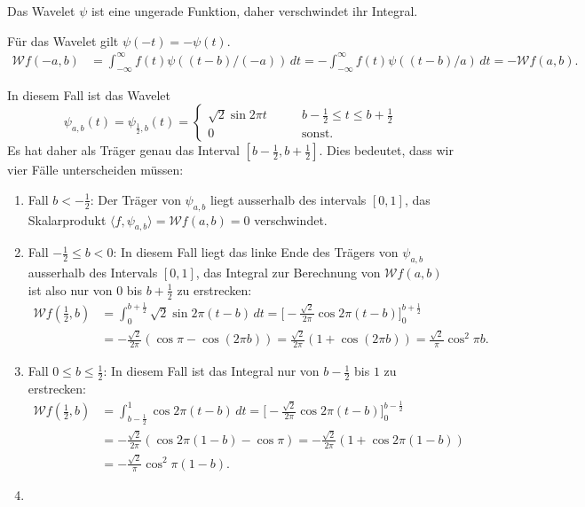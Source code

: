 \begin{loesung}
\begin{teilaufgaben}
%
\item
Das Wavelet $\psi$ ist eine ungerade Funktion, daher verschwindet ihr
Integral.
%
%
\item
Für das Wavelet gilt $\psi(-t)=-\psi(t)$.
\begin{align*}
\mathcal{W}f(-a,b)
&=
\int_{-\infty}^\infty f(t)\psi((t-b)/(-a))\,dt
=
-\int_{-\infty}^\infty f(t)\psi((t-b)/a)\,dt
=
-\mathcal{W}f(a,b).
\end{align*}
%
%
%
\item
In diesem Fall ist das Wavelet
\[
\psi_{a,b}(t)
=
\psi_{\frac12,b}(t)
=
\begin{cases}
\sqrt{2}\sin 2\pi t&\qquad b-\frac12\le t\le b+\frac12
\\
0&\qquad\text{sonst.}
\end{cases}
\]
Es hat daher als Träger genau das Interval $[b-\frac12,b+\frac12]$.
Dies bedeutet, dass wir vier Fälle unterscheiden müssen:
\begin{enumerate}
\item
Fall $b < -\frac12$:  Der Träger von $\psi_{a,b}$ liegt ausserhalb des
intervals $[0,1]$, das Skalarprodukt
$\langle f,\psi_{a,b}\rangle=\mathcal{W}f(a,b)=0$ verschwindet.
\item
Fall $-\frac12\le b < 0$: In diesem Fall liegt das linke Ende des Trägers
von $\psi_{a,b}$ ausserhalb des Intervals $[0,1]$, das Integral zur Berechnung
von $\mathcal{W}f(a,b)$ ist also nur von $0$ bis $b+\frac12$ zu erstrecken:
\begin{align*}
\mathcal{W}f({\textstyle\frac12},b)
&=
\int_{0}^{b+\frac12} \sqrt{2} \sin 2\pi(t-b)\,dt
=
\biggl[
-
\frac{\sqrt{2}}{2\pi}
\cos 2\pi(t-b)
\biggr]_0^{b+\frac12}
\\
&=
-\frac{\sqrt{2}}{2\pi}(\cos\pi - \cos(2\pi b))
=
\frac{\sqrt{2}}{2\pi}(1+\cos(2\pi b))
=
\frac{\sqrt{2}}{\pi}
\cos^2 \pi b.
\end{align*}
\item
Fall $0\le b \le \frac12$: In diesem Fall ist das Integral nur von $b-\frac12$
bis $1$ zu erstrecken:
\begin{align*}
\mathcal{W}f({\textstyle\frac12},b)
&=
\int_{b-\frac12}^1 \cos 2\pi (t-b)\,dt
=
\biggl[
-\frac{\sqrt{2}}{2\pi}\cos 2\pi(t-b)
\biggr]_0^{b-\frac12}
\\
&=
-\frac{\sqrt{2}}{2\pi}(
\cos 2\pi(1-b)
-
\cos \pi
)
=
-\frac{\sqrt{2}}{2\pi}(1+\cos 2\pi(1-b))
\\
&=
-\frac{\sqrt{2}}{\pi}\cos^2\pi(1-b).
\end{align*}
\item

\end{enumerate}
\end{teilaufgaben}
\end{loesung}
